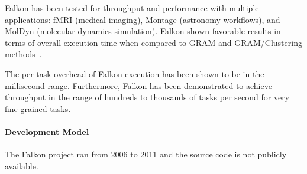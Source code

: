 \documentclass{sig-alternate}
\begin{document}
Falkon has been tested for throughput and performance with multiple
applications: fMRI (medical imaging), Montage (astronomy workflows), and MolDyn
(molecular dynamics simulation). Falkon shown favorable results in terms of
overall execution time when compared to GRAM and GRAM/Clustering
methods~\cite{1362680}.

The per task overhead of Falkon execution has been shown to be in the
millisecond range. Furthermore, Falkon has been demonstrated to achieve
throughput in the range of hundreds to thousands of tasks per second for very
fine-grained tasks.

\paragraph{Development Model}

The Falkon project ran from 2006 to 2011 and the source code is not publicly
available.

%
%
\end{document}
